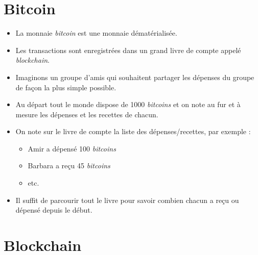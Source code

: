 \documentclass[12pt,class=report,crop=false]{standalone}
\begin{document}

\section*{Bitcoin}

\begin{itemize}
   \item La monnaie \emph{bitcoin} est une monnaie dématérialisée. 

   \item Les transactions sont enregistrées dans un grand livre de compte appelé \emph{blockchain}. 


   \item Imaginons un groupe d'amis qui souhaitent partager les dépenses du groupe de façon la plus simple possible.

   \item Au départ tout le monde dispose de 1000 \emph{bitcoins} et on note au fur et à mesure les dépenses et les recettes de chacun.
 
   \item On note sur le livre de compte la liste des dépenses/recettes, par exemple :
\begin{itemize}
  \item \og{}Amir a dépensé 100 \emph{bitcoins}\fg{}
  \item \og{}Barbara a reçu 45 \emph{bitcoins}\fg{}
  \item etc.
\end{itemize}

   \item Il suffit de parcourir tout le livre pour savoir combien chacun a reçu ou dépensé depuis le début.
\end{itemize}

\newpage

\section*{Blockchain}
\end{document}
